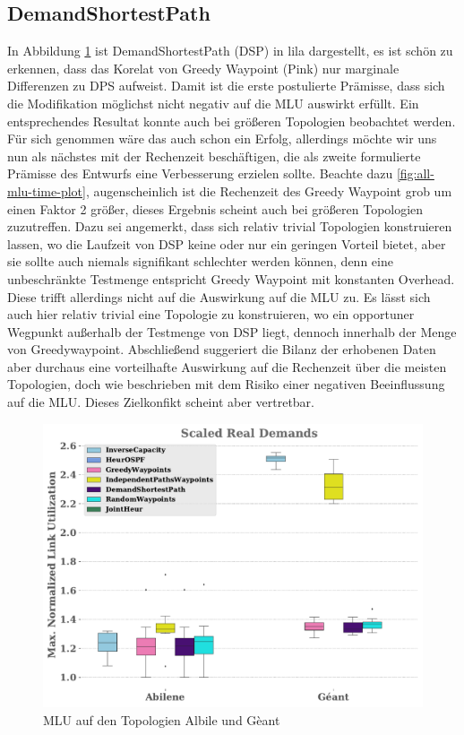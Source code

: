 \documentclass[sigconf,noacm,review]{acmart}
\begin{document}
\subsection{\textbf{DemandShortestPath}}
In Abbildung \ref{fig:mlu-abilene-geant} ist DemandShortestPath (DSP) in lila dargestellt, es ist schön zu erkennen, dass das Korelat von Greedy Waypoint (Pink) nur marginale Differenzen zu DPS aufweist. Damit ist die erste postulierte Prämisse, dass sich die Modifikation möglichst nicht negativ auf die MLU auswirkt erfüllt. Ein entsprechendes Resultat konnte auch bei größeren Topologien beobachtet werden. Für sich genommen wäre das auch schon ein Erfolg, allerdings möchte wir uns nun als nächstes mit der Rechenzeit beschäftigen, die als zweite formulierte Prämisse des Entwurfs eine Verbesserung erzielen sollte. Beachte dazu \ref{fig:all-mlu-time-plot}, augenscheinlich ist die Rechenzeit des Greedy Waypoint grob um einen Faktor 2 größer, dieses Ergebnis scheint auch bei größeren Topologien zuzutreffen. Dazu sei angemerkt, dass sich relativ trivial Topologien konstruieren lassen, wo die Laufzeit von DSP keine oder nur ein geringen Vorteil bietet, aber sie sollte auch niemals signifikant schlechter werden können, denn eine unbeschränkte Testmenge entspricht Greedy Waypoint mit konstanten Overhead.
Diese trifft allerdings nicht auf die Auswirkung auf die MLU zu. Es lässt sich auch hier relativ trivial eine Topologie zu konstruieren, wo ein opportuner Wegpunkt außerhalb der Testmenge von DSP liegt, dennoch innerhalb der Menge von Greedywaypoint. Abschließend suggeriert die Bilanz der erhobenen Daten aber durchaus eine vorteilhafte Auswirkung auf die Rechenzeit über die meisten Topologien, doch wie beschrieben mit dem Risiko einer negativen Beeinflussung auf die MLU. Dieses Zielkonfikt scheint aber vertretbar.

\begin{figure}
    \centering
    \includegraphics[width=\linewidth]{assets/real_demands-abilene-geant.pdf}
    \caption{MLU auf den Topologien Albile und Gèant}
    \label{fig:mlu-abilene-geant}
\end{figure}
\end{document}

